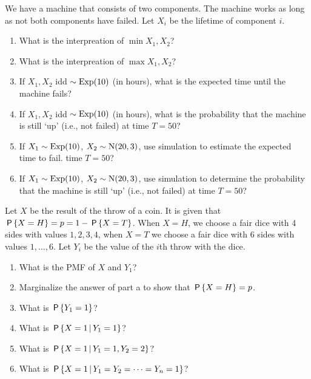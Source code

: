 \documentclass[a4paper]{article}
\begin{document}
\begin{exercise}
We have a machine that consists of two components. The machine works as long as not both components have failed. Let $X_i$ be the lifetime of component $i$. 
\begin{enumerate}
\item What is the interpreation of $\min{X_1, X_{2}}$?
\item What is the interpreation of $\max{X_1, X_{2}}$?
\item If $X_1, X_2$ idd $\sim \Exp{10}$ (in hours), what is the expected time until the machine fails? 
\item If $X_1, X_2$ idd $\sim \Exp{10}$ (in hours), what is the probability that the machine is still `up' (i.e., not failed) at time $T=50$? 
\item If $X_1\sim \Exp{10}$, $X_2 \sim \Norm{20, 3}$, use simulation to estimate the expected time to fail. time $T=50$? 
\item If $X_1\sim \Exp{10}$, $X_2 \sim \Norm{20, 3}$, use simulation to determine  the probability that the machine is still `up' (i.e., not failed) at time $T=50$? 
\end{enumerate}
\end{exercise}

\begin{exercise}
Let $X$ be the result of the throw of a coin.
It is given that $\P{X=H} = p = 1-\P{X=T}$.
When $X=H$, we choose a fair dice with 4 sides with values $1,2,3,4$, when $X=T$ we choose a fair dice with 6 sides with values $1,\ldots,6$.
Let $Y_i$ be the value of the $i$th throw with the dice.
\begin{enumerate}
\item What is the PMF of $X$ and $Y_1$?
\item Marginalize  the answer of part a to show that $\P{X=H} = p$. 
\item What is $\P{Y_{1}=1}$?
\item What is $\P{X=1 \given Y_1=1}$?
\item What is $\P{X=1 \given Y_1=1, Y_2=2}$?
\item What is $\P{X=1 \given Y_1=Y_2=\cdots=Y_n = 1}$?
\end{enumerate}
\end{exercise}
\end{document}
